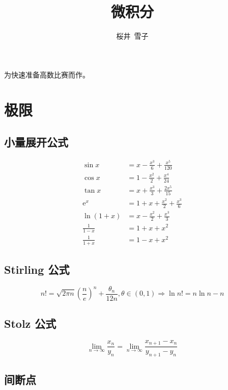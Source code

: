 \documentclass{ctexart}
\title{微积分}
\author{桜井\ 雪子}
\date{}
\begin{document}
\maketitle

为快速准备高数比赛而作。

\section{极限}

\subsection{小量展开公式}

\begin{align}
    \sin x          & = x - \frac{x^3}{6} + \frac{x^5}{120}   \\
    \cos x          & = 1 - \frac{x^2}{2} + \frac{x^4}{24}    \\
    \tan x          & = x + \frac{x^3}{3} + \frac{2 x^5}{15}  \\
    \mathrm{e}^x    & = 1 + x + \frac{x^2}{2} + \frac{x^3}{6} \\
    \ln (1 + x)     & = x - \frac{x^2}{2} + \frac{x^3}{3}     \\
    \frac{1}{1 - x} & = 1 + x + x^2                           \\
    \frac{1}{1 + x} & = 1 - x + x^2
\end{align}

\subsection{Stirling 公式}

\begin{equation}
    n! = \sqrt{2 \pi n} \left(\frac{n}{e}\right)^n + \frac{\theta_n}{12 n}, \theta \in (0, 1) \Rightarrow \ln n! = n \ln n - n
\end{equation}

\subsection{Stolz 公式}

\begin{equation}
    \lim_{n \to \infty} \frac{x_n}{y_n} = \lim_{n \to \infty} \frac{x_{n+1} - x_n}{y_{n+1} - y_n}
\end{equation}

\subsection{间断点}
\end{document}
